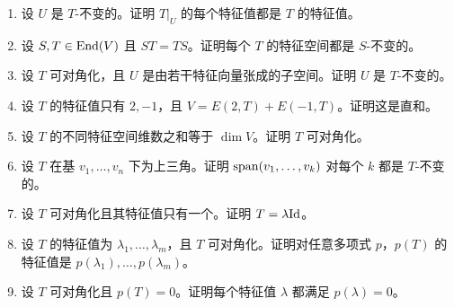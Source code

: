\begin{enumerate}[resume, label=\textbf{\arabic*.}, leftmargin=*, itemsep=0.5em]
\item \medium 设 $U$ 是 $T$-不变的。证明 $T|_U$ 的每个特征值都是 $T$ 的特征值。
\item \medium 设 $S,T\in\mathrm{End}(V)$ 且 $ST=TS$。证明每个 $T$ 的特征空间都是 $S$-不变的。
\item \medium 设 $T$ 可对角化，且 $U$ 是由若干特征向量张成的子空间。证明 $U$ 是 $T$-不变的。
\item \medium 设 $T$ 的特征值只有 $2,-1$，且 $V=E(2,T)+E(-1,T)$。证明这是直和。
\item \medium 设 $T$ 的不同特征空间维数之和等于 $\dim V$。证明 $T$ 可对角化。
\item \medium 设 $T$ 在基 $v_1,\dots,v_n$ 下为上三角。证明 $\operatorname{span}(v_1,\dots,v_k)$ 对每个 $k$ 都是 $T$-不变的。
\item \medium 设 $T$ 可对角化且其特征值只有一个。证明 $T=\lambda\mathrm{Id}$。
\item \medium 设 $T$ 的特征值为 $\lambda_1,\dots,\lambda_m$，且 $T$ 可对角化。证明对任意多项式 $p$，$p(T)$ 的特征值是 $p(\lambda_1),\dots,p(\lambda_m)$。
\item \medium 设 $T$ 可对角化且 $p(T)=0$。证明每个特征值 $\lambda$ 都满足 $p(\lambda)=0$。
\end{enumerate}

